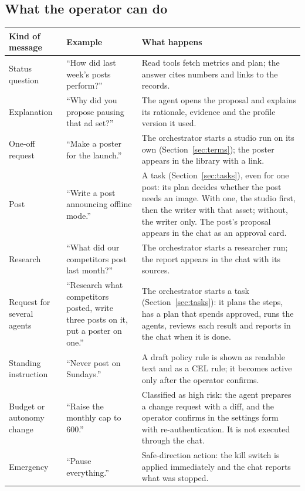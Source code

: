 \documentclass[11pt,a4paper]{article}
\begin{document}
\subsection{What the operator can do}
\begin{longtable}{@{}p{3.0cm}p{5.2cm}p{7.1cm}@{}}
\toprule
\textbf{Kind of message} & \textbf{Example} & \textbf{What happens}\\
\midrule
\endhead
Status question & ``How did last week's posts perform?'' & Read tools fetch metrics and plan; the answer cites numbers and links to the records.\\
Explanation & ``Why did you propose pausing that ad set?'' & The agent opens the proposal and explains its rationale, evidence and the profile version it used.\\
One-off request & ``Make a poster for the launch.'' & The orchestrator starts a studio run on its own (Section~\ref{sec:terms}); the poster appears in the library with a link.\\
Post & ``Write a post announcing offline mode.'' & A task (Section~\ref{sec:tasks}), even for one post: its plan decides whether the post needs an image. With one, the studio first, then the writer with that asset; without, the writer only. The post's proposal appears in the chat as an approval card.\\
Research & ``What did our competitors post last month?'' & The orchestrator starts a researcher run; the report appears in the chat with its sources.\\
Request for several agents & ``Research what competitors posted, write three posts on it, put a poster on one.'' & The orchestrator starts a task (Section~\ref{sec:tasks}): it plans the steps, has a plan that spends approved, runs the agents, reviews each result and reports in the chat when it is done.\\
Standing instruction & ``Never post on Sundays.'' & A draft policy rule is shown as readable text and as a CEL rule; it becomes active only after the operator confirms.\\
Budget or autonomy change & ``Raise the monthly cap to 600.'' & Classified as high risk: the agent prepares a change request with a diff, and the operator confirms in the settings form with re-authentication. It is not executed through the chat.\\
Emergency & ``Pause everything.'' & Safe-direction action: the kill switch is applied immediately and the chat reports what was stopped.\\
\bottomrule
\end{longtable}
\end{document}
